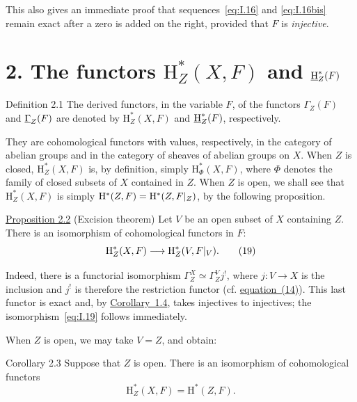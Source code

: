 This also gives an immediate proof that sequences~\eqref{eq:I.16} and
\eqref{eq:I.16bis} remain exact after a zero is added on the right,
provided that $F$ is \emph{injective}.
\section*{2. The functors $\mathrm H_Z^*(X,F)$ and $\mathop{\underline{\mathrm H}}\nolimits_Z^*(F)$}

\begin{sgastatement}{Definition 2.1}
The derived functors, in the variable $F$, of the functors $\Gamma_Z(F)$
and $\mathop{\underline{\Gamma}}\nolimits_Z(F)$ are denoted by $\mathrm H_Z^*(X,F)$ and $\mathop{\underline{\mathrm H}}\nolimits_Z^*(F)$,
respectively.
\end{sgastatement}

They are cohomological functors with values, respectively, in the category
of abelian groups and in the category of sheaves of abelian groups on $X$.
When $Z$ is closed, $\mathrm H_Z^*(X,F)$ is, by definition, simply
$\mathrm H_\Phi^*(X,F)$, where $\Phi$ denotes the family of closed subsets
of $X$ contained in $Z$. When $Z$ is open, we shall see that
$\mathrm H_Z^*(X,F)$ is simply
$\mathrm H^*(Z,F)=\mathrm H^*(Z,F\vert_{Z})$, by the following
proposition.

\begin{sgastatement}{\hyperref[I.2.2]{Proposition 2.2} (Excision theorem)}
Let $V$ be an open subset of $X$ containing $Z$. There is an isomorphism of
cohomological functors in $F$:
\begin{equation}
  \mathrm H_Z^*(X,F)
  \longrightarrow
  \mathrm H_Z^*(V,F\vert_{V}).
  \tag{19}\label{eq:I.19}
\end{equation}
\end{sgastatement}

Indeed, there is a functorial isomorphism
$\Gamma_Z^X\simeq\Gamma_Z^Vj^!$, where $j\colon V\to X$ is the inclusion
and $j^!$ is therefore the restriction functor (cf. \hyperref[eq:I.14]{equation~(14)}). This
last functor is exact and, by \hyperref[I.1.4]{Corollary~1.4}, takes injectives to injectives;
the isomorphism~\eqref{eq:I.19} follows immediately.

When $Z$ is open, we may take $V=Z$, and obtain:

\begin{sgastatement}{Corollary 2.3}
Suppose that $Z$ is open. There is an isomorphism of cohomological functors
\begin{equation}
  \mathrm H_Z^*(X,F)=\mathrm H^*(Z,F).
  \tag{20}\label{eq:I.20}
\end{equation}
\end{sgastatement}

